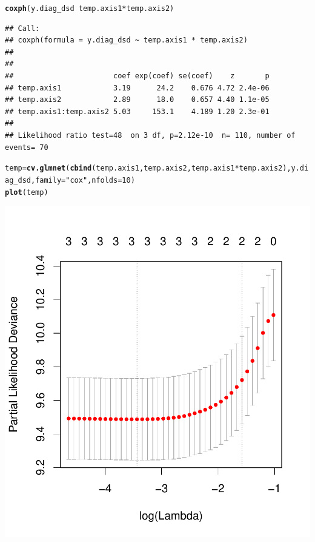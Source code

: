 \documentclass{article}\usepackage[]{graphicx}\usepackage[]{color}
\makeatletter
\def\maxwidth{ %
  \ifdim\Gin@nat@width>\linewidth
    \linewidth
  \else
    \Gin@nat@width
  \fi
}
\newcommand{\hlnum}[1]{\textcolor[rgb]{0.686,0.059,0.569}{#1}}%
\newcommand{\hlstr}[1]{\textcolor[rgb]{0.192,0.494,0.8}{#1}}%
\newcommand{\hlopt}[1]{\textcolor[rgb]{0,0,0}{#1}}%
\newcommand{\hlstd}[1]{\textcolor[rgb]{0.345,0.345,0.345}{#1}}%
\newcommand{\hlkwb}[1]{\textcolor[rgb]{0.69,0.353,0.396}{#1}}%
\newcommand{\hlkwc}[1]{\textcolor[rgb]{0.333,0.667,0.333}{#1}}%
\newcommand{\hlkwd}[1]{\textcolor[rgb]{0.737,0.353,0.396}{\textbf{#1}}}%
\newenvironment{kframe}{%
 \def\at@end@of@kframe{}%
 \ifinner\ifhmode%
  \def\at@end@of@kframe{\end{minipage}}%
  \begin{minipage}{\columnwidth}%
 \fi\fi%
 \def\FrameCommand##1{\hskip\@totalleftmargin \hskip-\fboxsep
 \colorbox{shadecolor}{##1}\hskip-\fboxsep
     \hskip-\linewidth \hskip-\@totalleftmargin \hskip\columnwidth}%
 \MakeFramed {\advance\hsize-\width
   \@totalleftmargin\z@ \linewidth\hsize
   \@setminipage}}%
 {\par\unskip\endMakeFramed%
 \at@end@of@kframe}
\newenvironment{knitrout}{}{} %
\makeatother
\begin{document}
\begin{knitrout}
{}


\begin{kframe}\begin{alltt}
\hlkwd{coxph}\hlstd{(y.diag_dsd} \hlopt{~} \hlstd{temp.axis1} \hlopt{*} \hlstd{temp.axis2)}
\end{alltt}
\begin{verbatim}
## Call:
## coxph(formula = y.diag_dsd ~ temp.axis1 * temp.axis2)
## 
## 
##                       coef exp(coef) se(coef)    z       p
## temp.axis1            3.19      24.2    0.676 4.72 2.4e-06
## temp.axis2            2.89      18.0    0.657 4.40 1.1e-05
## temp.axis1:temp.axis2 5.03     153.1    4.189 1.20 2.3e-01
## 
## Likelihood ratio test=48  on 3 df, p=2.12e-10  n= 110, number of events= 70
\end{verbatim}
\begin{alltt}
\hlstd{temp} \hlkwb{=} \hlkwd{cv.glmnet}\hlstd{(}\hlkwd{cbind}\hlstd{(temp.axis1, temp.axis2, temp.axis1}\hlopt{*}\hlstd{temp.axis2), y.diag_dsd,} \hlkwc{family} \hlstd{=} \hlstr{"cox"}\hlstd{,} \hlkwc{nfolds} \hlstd{=} \hlnum{10}\hlstd{)}
\hlkwd{plot}\hlstd{(temp)}
\end{alltt}
\end{kframe}

{\centering \includegraphics[width=\maxwidth]{figure/metagene-pairs-11} 

}
\end{knitrout}
\end{document}
